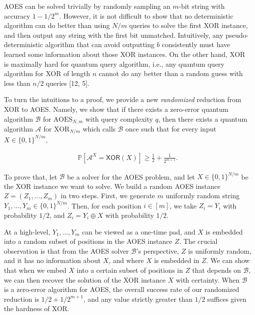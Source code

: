 AOES can be solved trivially by randomly sampling an $m$-bit string with accuracy $1-1/2^{m}$. However, it is not difficult to show that no deterministic algorithm can do better than using $N/m$ queries to solve the first XOR instance, and then output any string with the first bit unmatched.
Intuitively, any pseudo-deterministic algorithm that can avoid outputting $b$ consistently must have learned some information about those XOR instances. On the other hand, XOR is maximally hard for quantum query algorithm, i.e., any quantum query algorithm for XOR of length $n$ cannot do any better than a random guess with less than $n/2$ queries [12, 5].\par




To turn the intuitions to a proof, we provide a new \emph{randomized} reduction from XOR to AOES. Namely, we show that if there exists a zero-error quantum algorithm $\mathcal{B}$ for ${\text{AOES}}_{N,m}$ with query complexity $q$, then there exists a quantum algorithm $\mathcal{A}$ for ${\text{XOR}}_{N/m}$ which calls $\mathcal{B}$ once such that for every input $X\in\{0,1\}^{N/m}$,\par


\[\begin{gathered}
\mathbb{P}\left[\mathcal{A}^{X}=\mathsf{XOR}(X)\right]\geq\frac{1}{2}+\frac{1}{2^{m+1}}.
\end{gathered}\]




To prove that, let $\mathcal{B}$ be a solver for the AOES problem, and let $X\in\{0,1\}^{N/m}$ be the XOR instance we want to solve. We build a random AOES instance $Z=(Z_{1},\ldots,Z_{m})$ in two steps. First, we generate $m$ uniformly random string $Y_{1},\ldots,Y_{m}\in\{0,1\}^{N/m}$. Then, for each position $i\in[m]$, we take $Z_{i}=Y_{i}$ with probability $1/2$, and $Z_{i}=Y_{i}\oplus X$ with probability $1/2$.\par




At a high-level, $Y_{1},\ldots,Y_{m}$ can be viewed as a one-time pad, and $X$ is embedded into a random subset of positions in the AOES instance $Z$. The crucial observation is that from the AOES solver $\mathcal{B}$’s perspective, $Z$ is uniformly random, and it has no information about $X$, and where $X$ is embedded in $Z$.
We can show that when we embed $X$ into a certain subset of positions in $Z$ that depends on $\mathcal{B}$, we can then recover the solution of the XOR instance $X$ with certainty. When $\mathcal{B}$ is a zero-error algorithm for AOES, the overall success rate of our randomized reduction is $1/2+1/2^{m+1}$, and any value strictly greater than $1/2$ suffices given the hardness of XOR.\par




